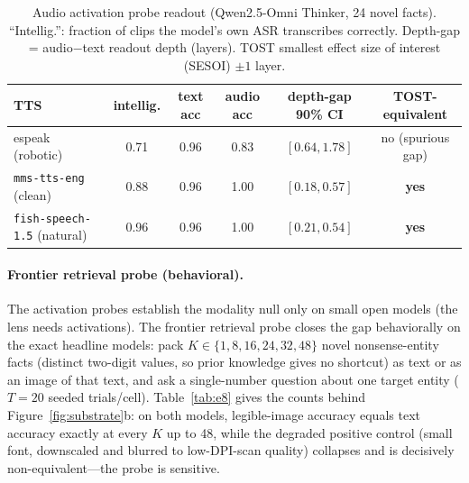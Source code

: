 \documentclass[11pt]{article}
\begin{document}
\begin{table}[h]
\small\centering
\caption{Audio activation probe readout (Qwen2.5-Omni Thinker, 24 novel facts). ``Intellig.'': fraction of clips the model's own ASR transcribes correctly. Depth-gap = audio$-$text readout depth (layers). TOST smallest effect size of interest (SESOI) $\pm 1$ layer.}
\label{tab:e7}
\setlength{\tabcolsep}{4pt}
\begin{tabular}{lccccc}
\toprule
TTS & intellig. & text acc & audio acc & depth-gap 90\% CI & TOST-equivalent \\
\midrule
espeak (robotic)        & 0.71 & 0.96 & 0.83 & $[0.64, 1.78]$ & no (spurious gap) \\
\texttt{mms-tts-eng} (clean)   & 0.88 & 0.96 & 1.00 & $[0.18, 0.57]$ & \textbf{yes} \\
\texttt{fish-speech-1.5} (natural) & 0.96 & 0.96 & 1.00 & $[0.21, 0.54]$ & \textbf{yes} \\
\bottomrule
\end{tabular}
\end{table}

\paragraph{Frontier retrieval probe (behavioral).}
The activation probes establish the modality null only on small open models (the lens needs activations). The frontier retrieval probe closes the gap behaviorally on the exact headline models: pack $K\in\{1,8,16,24,32,48\}$ novel nonsense-entity facts (distinct two-digit values, so prior knowledge gives no shortcut) as text or as an image of that text, and ask a single-number question about one target entity ($T{=}20$ seeded trials/cell). Table~\ref{tab:e8} gives the counts behind Figure~\ref{fig:substrate}b: on both models, legible-image accuracy equals text accuracy exactly at every $K$ up to 48, while the degraded positive control (small font, downscaled and blurred to low-DPI-scan quality) collapses and is decisively non-equivalent---the probe is sensitive.
\end{document}
